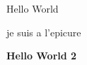 \documentclass[a4paper]{article}
\begin{document}
  Hello World

  je suis a l'epicure



  \textbf{Hello World 2}
\end{document}
